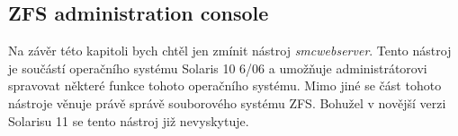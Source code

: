     \subsection{ZFS administration console}
    Na závěr této kapitoli bych chtěl jen zmínit nástroj \emph{smcwebserver}. Tento nástroj je součástí operačního systému Solaris 10 6/06 a umožňuje administrátorovi spravovat některé funkce tohoto operačního systému. Mimo jiné se část tohoto nástroje věnuje právě správě souborového systému ZFS. Bohužel v novější verzi Solarisu 11 se tento nástroj již nevyskytuje.         